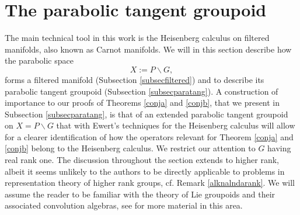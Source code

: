 \documentclass[a4paper,reqno]{amsart}
\numberwithin{equation}{section}
\theoremstyle{definition}
\theoremstyle{remark}
\begin{document}
\section{The parabolic tangent groupoid}
\label{lnlnadna}

The main technical tool in this work is the Heisenberg calculus on filtered manifolds, also known as Carnot manifolds. We will in this section describe how the parabolic space 
$$X:=P\backslash G,$$ 
forms a filtered manifold (Subsection \ref{subsecfiltered}) and to describe its parabolic tangent groupoid (Subsection \ref{subsecparatang}). A construction of importance to our proofs of  Theorems \ref{conja} and \ref{conjb}, that we present in Subsection \ref{subsecparatang}, is that of an extended parabolic tangent groupoid on $X=P\backslash G$ that with Ewert's techniques \cite{ewertthesis, ewertfixed} for the Heisenberg calculus will allow for a clearer identification of how the operators relevant for Theorem \ref{conja} and \ref{conjb} belong to the Heisenberg calculus. We restrict our attention to $G$ having real rank one. The discussion throughout the section extends to higher rank, albeit it seems unlikely to the authors to be directly applicable to problems in representation theory of higher rank groups, cf. Remark \ref{alknalndarank}. We will assume the reader to be familiar with the theory of Lie groupoids and their associated convolution algebras, see \cite{debordlescure,debordskandext,debordskandpseudo} for more material in this area. 
\end{document}
